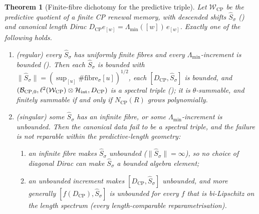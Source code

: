 \documentclass[11pt]{article}
\newtheorem{theorem}{Theorem}[section]
\theoremstyle{definition}
\theoremstyle{remark}
\newcommand{\B}{\mathcal{B}}
\newcommand{\Hh}{\mathcal{H}}
\newcommand{\W}{\mathcal{W}}
\newcommand{\CP}{\mathrm{CP}}
\newcommand{\Lam}{\Lambda}
\newcommand{\norm}[1]{\lVert#1\rVert}
\begin{document}
\begin{theorem}[Finite-fibre dichotomy for the predictive triple]
\label{thm:fibre-dichotomy}
Let $\W_{\CP}$ be the predictive quotient of a finite CP renewal memory, with
descended shifts $\widehat S_\sigma$ \textup{(}\textup{)}
and canonical length Dirac $D_{\CP}e_{[w]}=\Lam_{\min}([w])\,e_{[w]}$.  Exactly
one of the following holds.
\begin{enumerate}[label=\textup{(\arabic*)},leftmargin=2.4em]
\item \textup{(regular)} every $\widehat S_\sigma$ has uniformly finite fibres and
      every $\Lam_{\min}$-increment is bounded \textup{(}\textup{)}.
      Then each $\widehat S_\sigma$ is bounded with
      $\norm{\widehat S_\sigma}=(\sup_{[u]}\#\text{fibre}_\sigma[u])^{1/2}$, each
      $[D_{\CP},\widehat S_\sigma]$ is bounded, and
      $(\B_{\CP,0},\ell^2(\W_{\CP})\otimes\Hh_{\rm int},D_{\CP})$ is a spectral
      triple \textup{(}\textup{)}; it is $\theta$-summable, and
      finitely summable if and only if $N_{\CP}(R)$ grows polynomially.
\item \textup{(singular)} some $\widehat S_\sigma$ has an infinite fibre, or some
      $\Lam_{\min}$-increment is unbounded.  Then the canonical data fail to be a
      spectral triple, and the failure is not reparable within the
      predictive-length geometry:
      \begin{enumerate}[label=\textup{(2\alph*)},leftmargin=2.4em]
      \item an infinite fibre makes $\widehat S_\sigma$ unbounded
            ($\norm{\widehat S_\sigma}=\infty$), so no choice of diagonal Dirac
            can make $\widehat S_\sigma$ a bounded algebra element;
      \item an unbounded increment makes $[D_{\CP},\widehat S_\sigma]$ unbounded,
            and more generally $[f(D_{\CP}),\widehat S_\sigma]$ is unbounded for
            every $f$ that is bi-Lipschitz on the length spectrum
            \textup{(}every length-comparable reparametrisation\textup{)}.
      \end{enumerate}
\end{enumerate}
\end{theorem}
\end{document}
